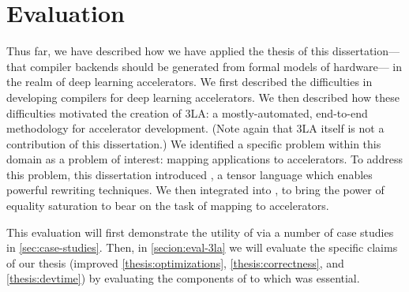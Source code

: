 \chapter{Evaluation}
\label{chapter:part1-evaluation}

Thus far, we have described
  how we have applied
  the thesis of this dissertation---%
  that compiler backends
  should be generated
  from formal models of hardware---%
  in the realm of deep learning accelerators.
We first described the difficulties
  in developing compilers
  for deep learning accelerators.
We then described how these difficulties
  motivated the creation of
  3LA: a mostly-automated, end-to-end
  methodology
  for accelerator development.
(Note again that 3LA itself
  is not a contribution of this dissertation.)
We identified a specific problem
  within this domain
  as a problem of interest:
  mapping applications to accelerators.
To address this problem,
  this dissertation
  introduced
  \g,
  a tensor language
  which enables powerful rewriting techniques.
We then integrated \g 
  into \TLA,
  to bring the power of equality saturation
  to bear on the task
  of mapping to accelerators.
  
This evaluation will first demonstrate the utility of
  \g
  via a number of case studies
  in \cref{sec:case-studies}.
Then, 
  in \cref{secion:eval-3la}
  we will evaluate the specific claims
  of our thesis
    (improved \cref{thesis:optimizations},
     \cref{thesis:correctness}, and
     \cref{thesis:devtime})
  by evaluating the components of \TLA 
  to which \g was essential.

  














